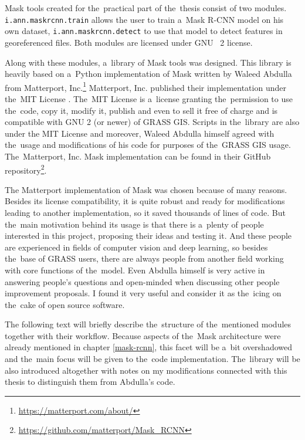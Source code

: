 Mask  tools created for the~practical part of the~thesis consist of
two modules. \verb|i.ann.maskrcnn.train| allows the user to train a~Mask R-CNN model 
on his own dataset, \verb|i.ann.maskrcnn.detect| to use that model to 
detect features in georeferenced files. Both modules are licensed under GNU
~2 license.

Along with these modules, a~library of Mask  tools was designed. This
library is heavily based on a~Python implementation of Mask  written 
by Waleed Abdulla from Matterport, 
Inc.\footnote{\url{https://matterport.com/about/}}  Matterport, Inc. published 
their implementation under the~MIT License \cite{mit}. The~MIT License is
a~license granting the~permission to use the~code, copy it, modify it, publish and 
even to sell it free of charge and is compatible with GNU  
2 (or newer) \cite{gplv2} of GRASS GIS. Scripts in the~library are also under 
the MIT License and moreover, Waleed Abdulla himself agreed with the~usage and 
modifications of his code for purposes of the~GRASS GIS usage. The~Matterport, 
Inc. Mask  implementation can be found in their GitHub 
repository\footnote{\url{https://github.com/matterport/Mask\_RCNN}}.

The Matterport implementation of Mask  was chosen because of many 
reasons. Besides its license compatibility, it is quite robust and ready for 
modifications leading to another implementation, so it saved thousands of lines 
of code. But the~main motivation behind its usage is that there is a~plenty of 
people interested in this project, proposing their ideas and testing it. And 
these people are experienced in fields of computer vision and deep learning, so 
besides the~base of GRASS  users, there are always people from another 
field working with core functions of the~model. Even Abdulla himself is very 
active in answering people's questions and open-minded when discussing other 
people improvement proposals. I found it very useful and consider it as
the~icing on the~cake of open source software.

The following text will briefly describe the~structure of the~mentioned modules 
together with their workflow. Because aspects of the~Mask  
architecture were already mentioned in chapter \ref{mask-rcnn}, this facet will 
be a~bit overshadowed and the~main focus will be given to the~code 
implementation. The~library will be also introduced altogether with notes on my 
modifications connected with this thesis to distinguish them from Abdulla's 
code.

